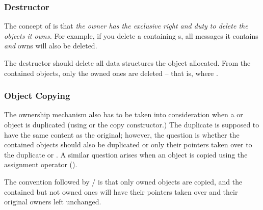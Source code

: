 \subsubsection{Destructor}
\label{sec:sim-lib:ownership-and-container-destructor}

The concept of  is that
\textit{the owner has the exclusive right and duty to delete the objects it owns.}
For example, if you delete a  containing s,
all messages it contains \textit{and} owns will also be deleted.

The destructor should delete all data structures the object allocated.
From the contained objects, only the owned ones are deleted -- that is,
where .


\subsubsection{Object Copying}
\label{sec:sim-lib:ownership-and-object-copying}

The ownership mechanism also has to be taken into consideration
when a  or  object is duplicated
(using  or the copy constructor.)
The duplicate is supposed to have the same content as the
original; however, the question is whether the contained objects
should also be duplicated or only their pointers taken over
to the duplicate  or . A similar
question arises when an object is copied using the assignment operator
().

The convention followed by / is that
only owned objects are copied, and the contained but not owned ones
will have their pointers taken over and their original owners
left unchanged.


%
%
%
%
%
%
%


